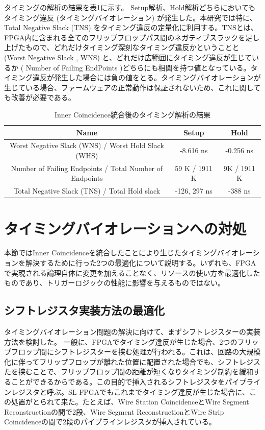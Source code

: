 タイミングの解析の結果を表\ref{tab:timing_before}に示す。
Setup解析、Hold解析どちらにおいてもタイミング違反 (タイミングバイオレーション) が発生した。本研究では特に、Total Negative Slack (TNS) をタイミング違反の定量化に利用する。TNSとは、FPGA内に含まれる全てのフリップフロップパス間のネガティブスラックを足し上げたもので、どれだけタイミング深刻なタイミング違反かということと (Worst Negative Slack , WNS) と、どれだけ広範囲にタイミング違反が生じているか ( Number of Failing EndPoints )どちらにも相関を持つ値となっている。タイミング違反が発生した場合には負の値をとる。タイミングバイオレーションが生じている場合、ファームウェアの正常動作は保証されないため、これに関しても改善が必要である。
\begin{table}[]
    \centering
    \caption{Inner Coincidence統合後のタイミング解析の結果}
    \label{tab:timing_before}
    \begin{tabular}{|c|c|c|}
    \hline
    Name                                                    & Setup         & Hold        \\ \hline\hline
    Worst Negative Slack (WNS) / Worst Hold Slack (WHS)     & -8.616 ns     & -0.256 ns   \\ \hline
    Number of Failing Endpoints / Total Number of Endpoints & 59 K / 1911 K & 9K / 1911 K \\ \hline
    Total Negative Slack (TNS) / Total Hold slack           & -126, 297 ns  & -388 ns     \\ \hline
    \end{tabular}
\end{table}

\section{タイミングバイオレーションへの対処}
本節ではInner Coincidenceを統合したことにより生じたタイミングバイオレーションを解決するために行った2つの最適化について説明する。いずれも、FPGAで実現される論理自体に変更を加えることなく、リソースの使い方を最適化したものであり、トリガーロジックの性能に影響を与えるものではない。

\subsection{シフトレジスタ実装方法の最適化}
タイミングバイオレーション問題の解決に向けて、まずシフトレジスターの実装方法を検討した。
一般に、FPGAでタイミング違反が生じた場合、2つのフリップフロップ間にシフトレジスターを挟む処理が行われる。これは、回路の大規模化に伴ってフリップフロップが離れた位置に配置された場合でも、シフトレジスたを挟むことで、フリップフロップ間の距離が短くなりタイミング制約を緩和することができるからである。この目的で挿入されるシフトレジスタをパイプラインレジスタと呼ぶ。SL FPGAでもこれまでタイミング違反が生じた場合に、この処置がとられて来た。たとえば、Wire Station CoincidenceとWire Segment Reconstructionの間で2段、Wire Segment ReconstructionとWire Strip Coincidenceの間で2段のパイプラインレジスタが挿入されている。

